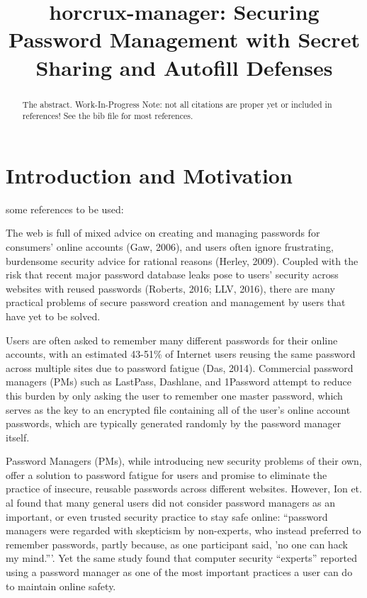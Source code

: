 \documentclass[conference]{IEEEtran}
\begin{document}
\title{horcrux-manager: Securing Password Management with Secret Sharing and
Autofill Defenses}

\author{

}
\maketitle

\begin{abstract}
The abstract. Work-In-Progress Note: not all citations are proper yet or
  included in references! See the bib file for most references.
\end{abstract}

\section{Introduction and Motivation}

some references to be used:
\cite{silver2014password}
\cite{ion2015no}
\cite{li2014emperor}
\cite{goodin2015}
\cite{das2014tangled}
\cite{khandelwal2016}
\cite{titcomb2015}
\cite{shamir1979share}


The web is full of mixed advice on creating and managing passwords for consumers'
online accounts (Gaw, 2006), and users often ignore frustrating, burdensome
security advice for rational reasons (Herley, 2009). Coupled with the risk that
recent major password database leaks pose to users' security across websites
with reused passwords (Roberts, 2016; LLV, 2016), there are many practical
problems of secure password creation and management by users that have yet to be
solved.

Users are often asked to remember many different passwords for their online
accounts, with an estimated 43-51\% of Internet users reusing the same password
across multiple sites due to password fatigue (Das, 2014). Commercial password
managers (PMs) such as LastPass, Dashlane, and 1Password attempt to reduce this
burden by only asking the user to remember one master password, which serves as
the key to an encrypted file containing all of the user's online account
passwords, which are typically generated randomly by the password manager
itself.

Password Managers (PMs), while introducing new security problems of their own,
offer a solution to password fatigue for users and promise
to eliminate the practice of insecure, reusable passwords across different
websites. However, Ion et. al \cite{ion2015no} found
that many general users did not consider password managers as an important, or
even trusted security practice to stay safe online: ``password managers were
regarded with skepticism by non-experts, who instead preferred to remember
passwords, partly because, as one participant said, 'no one can hack my mind.'''.
Yet the same study found that computer security ``experts'' reported using a
password manager as one of the most important practices a user can do to
maintain online safety.
\end{document}
